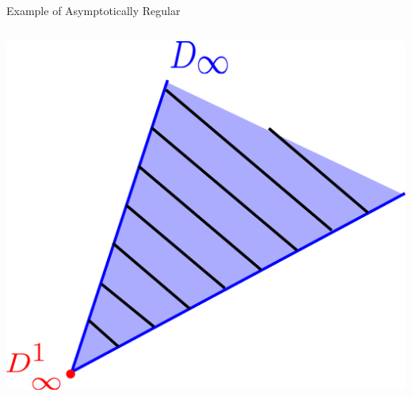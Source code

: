 \documentclass[aspectratio=169, dvipdfmx, 11pt]{beamer} %
\begin{document}
\begin{frame}{Example of Asymptotically Regular}
\begin{columns}
\begin{column}{0.48\textwidth}
    \includegraphics[keepaspectratio, scale=0.085]{figures/example_not_asymptotically_regular_2.eps}
    \end{column}
  \end{columns}
\end{frame}
\end{document}
